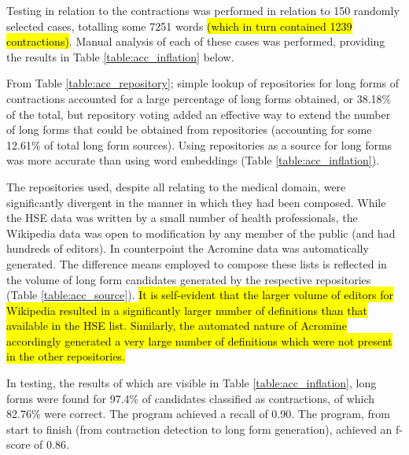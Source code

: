 Testing in relation to the contractions was performed in relation to 150 randomly selected cases, totalling
some 7251 words \hl{(which in turn contained 1239 contractions)}. Manual analysis of each of these cases was performed, providing the results in Table \ref{table:acc_inflation} below.

From Table \ref{table:acc_repository}; simple lookup of repositories for long forms of contractions accounted for a large percentage of long forms obtained, or 38.18\% of the total, but repository voting added an effective way to extend the number of long forms that could be obtained from repositories (accounting for some 12.61\% of total long form sources). Using repositories as a source for long forms was more accurate than using word embeddings (Table \ref{table:acc_inflation}). 

The repositories used, despite all relating to the medical domain, were significantly divergent in the manner in which they had been composed. While the HSE data was written by a small number of health professionals, the Wikipedia data was open to modification by any member of the public (and had hundreds of editors). In counterpoint the Acromine data was automatically generated. The difference means employed to compose these lists is reflected in the volume of long form candidates generated by the respective repositories (Table \ref{table:acc_source}).\hl{ It is self-evident that the larger volume of editors for Wikipedia resulted in a significantly larger number of definitions than that available in the HSE list. Similarly, the automated nature of Acromine accordingly generated a very large number of definitions which were not present in the other repositories.} 

In testing, the results of which are visible in Table \ref{table:acc_inflation}, long forms were found for 97.4\% of candidates classified as contractions, of which 82.76\% were correct. The program achieved a recall of 0.90. The program, from start to finish (from contraction detection to long form generation), achieved an f-score of 0.86.

